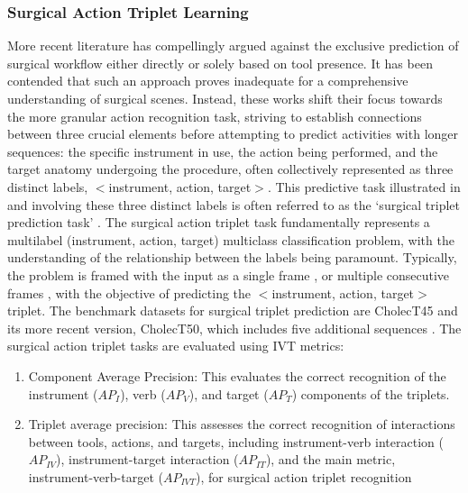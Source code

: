 \subsubsection{Surgical Action Triplet Learning}
\label{sec:review-triplet-learning}
More recent literature has compellingly argued against the exclusive prediction of surgical workflow either directly or solely based on tool presence. It has been contended that such an approach proves inadequate for a comprehensive understanding of surgical scenes. Instead, these works shift their focus towards the more granular action recognition task, striving to establish connections between three crucial elements before attempting to predict activities with longer sequences: the specific instrument in use, the action being performed, and the target anatomy undergoing the procedure, often collectively represented as three distinct labels, $<$instrument, action, target$>$.
This predictive task illustrated in  and involving these three distinct labels is often referred to as the `surgical triplet prediction task' \citep{laproscopic_rule_based_action_triplets}.
The surgical action triplet task fundamentally represents a multilabel (instrument, action, target) multiclass classification problem, with the understanding of the relationship between the labels being paramount. Typically, the problem is framed with the input as a single frame \citep{1nywoye_rec_action_triplets,NWOYE2022102433_rendevous}, or multiple consecutive frames \citep{sharma2022RendezvousInTime}, with the objective of predicting the $<$instrument, action, target$>$ triplet. 
The benchmark datasets for surgical triplet prediction are CholecT45 and its more recent version, CholecT50, which includes five additional sequences \citep{NWOYE2022102433_rendevous}. The surgical action triplet tasks are evaluated using IVT metrics:

\begin{enumerate}
    \item Component Average Precision: This evaluates the correct recognition of the instrument ($AP_I$), verb ($AP_V$), and target ($AP_T$) components of the triplets.
    \item Triplet average precision: This assesses the correct recognition of interactions between tools, actions, and targets, including instrument-verb interaction ($AP_{IV}$), instrument-target interaction ($AP_{IT}$), and the main metric, instrument-verb-target ($AP_{IVT}$), for surgical action triplet recognition
\end{enumerate}


